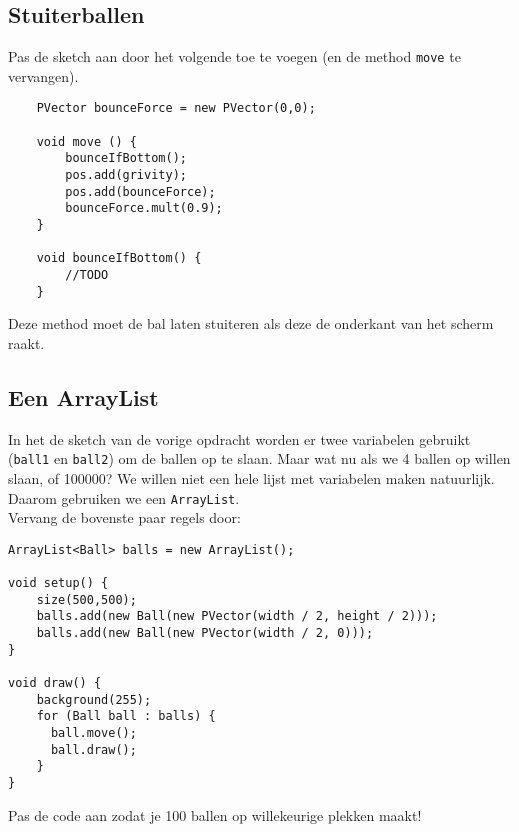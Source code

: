 \documentclass{../qh_exercise}
\begin{document}
\newpage
\subsection{Stuiterballen}
Pas de sketch aan door het volgende toe te voegen (en de method \texttt{move} te vervangen).
\begin{lstlisting}
    PVector bounceForce = new PVector(0,0);

    void move () {
        bounceIfBottom();
        pos.add(grivity);
        pos.add(bounceForce);
        bounceForce.mult(0.9);
    }

    void bounceIfBottom() {
        //TODO
    }
\end{lstlisting}
Deze method moet de bal laten stuiteren als deze de onderkant van het scherm raakt. 

\subsection{Een ArrayList}
In het de sketch van de vorige opdracht worden er twee variabelen gebruikt (\texttt{ball1} en \texttt{ball2}) om de ballen op te slaan. Maar wat nu als we 4 ballen op willen slaan, of 100000? We willen niet een hele lijst met variabelen maken natuurlijk. Daarom gebruiken we een \texttt{ArrayList}. \\
Vervang de bovenste paar regels door:
\begin{lstlisting}
ArrayList<Ball> balls = new ArrayList();

void setup() {
    size(500,500);
    balls.add(new Ball(new PVector(width / 2, height / 2)));
    balls.add(new Ball(new PVector(width / 2, 0)));
}

void draw() {
    background(255);
    for (Ball ball : balls) {
      ball.move();
      ball.draw();
    }  
}
\end{lstlisting}
Pas de code aan zodat je 100 ballen op willekeurige plekken maakt!
\end{document}
